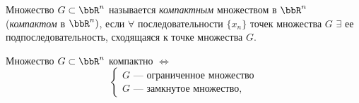 \begin{defn}
Множество $G \subset \bbR^n$ называется \textit{компактным} множеством в $\bbR^n$ (\textit{компактом} в $\bbR^n)$, если $\forall$ последовательности $\{ x_n \}$ точек множества $G$ $\exists$ ее подпоследовательность, сходящаяся к точке множества $G$.
\end{defn}

\begin{thm}
Множество $G \subset \bbR^n$ компактно $\Leftrightarrow$
\begin{equation}
\begin{cases}
G \textit{ --- ограниченное множество} \\
G \textit{ --- замкнутое множество},
\end{cases}
\end{equation}
\end{thm}

